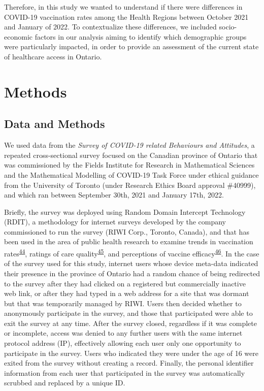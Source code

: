 \documentclass[
]{article}
\begin{document}
Therefore, in this study we wanted to understand if there were
differences in COVID-19 vaccination rates among the Health Regions
between October 2021 and January of 2022. To contextualize these
differences, we included socio-economic factors in our analysis aiming
to identify which demographic groups were particularly impacted, in
order to provide an assessment of the current state of healthcare access
in Ontario.

\hypertarget{methods}{%
\section{Methods}\label{methods}}

\hypertarget{sec-data}{%
\subsection{Data and Methods}\label{sec-data}}

We used data from the \emph{Survey of COVID-19 related Behaviours and
Attitudes}, a repeated cross-sectional survey focused on the Canadian
province of Ontario that was commissioned by the Fields Institute for
Research in Mathematical Sciences and the Mathematical Modelling of
COVID-19 Task Force under ethical guidance from the University of
Toronto (under Research Ethics Board approval \#40999), and which ran
between September 30th, 2021 and January 17th, 2022.

Briefly, the survey was deployed using Random Domain Intercept
Technology (RDIT), a methodology for internet surveys developed by the
company commissioned to run the survey (RIWI Corp., Toronto, Canada),
and that has been used in the area of public health research to examine
trends in vaccination
rates\textsuperscript{\protect\hyperlink{ref-sargent2022}{44}}, ratings
of care quality\textsuperscript{\protect\hyperlink{ref-kim2021}{45}},
and perceptions of vaccine
efficacy\textsuperscript{\protect\hyperlink{ref-seeman2010}{46}}. In the
case of the survey used for this study, internet users whose device
meta-data indicated their presence in the province of Ontario had a
random chance of being redirected to the survey after they had clicked
on a registered but commercially inactive web link, or after they had
typed in a web address for a site that was dormant but that was
temporarily managed by RIWI. Users then decided whether to anonymously
participate in the survey, and those that participated were able to exit
the survey at any time. After the survey closed, regardless if it was
complete or incomplete, access was denied to any further users with the
same internet protocol address (IP), effectively allowing each user only
one opportunity to participate in the survey. Users who indicated they
were under the age of 16 were exited from the survey without creating a
record. Finally, the personal identifier information from each user that
participated in the survey was automatically scrubbed and replaced by a
unique ID.
\end{document}
